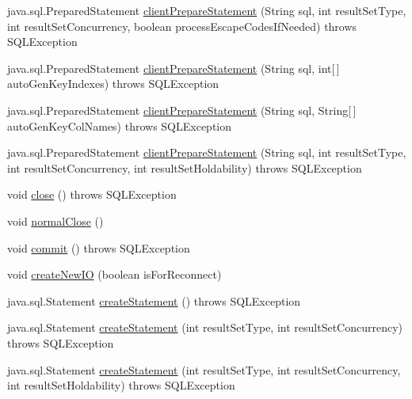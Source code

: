 \begin{DoxyCompactItemize}
java.\+sql.\+Prepared\+Statement \mbox{\hyperlink{classcom_1_1mysql_1_1cj_1_1jdbc_1_1_connection_impl_a18396b29f2d238be089029b1db546a00}{client\+Prepare\+Statement}} (String sql, int result\+Set\+Type, int result\+Set\+Concurrency, boolean process\+Escape\+Codes\+If\+Needed)  throws S\+Q\+L\+Exception 
\item 
java.\+sql.\+Prepared\+Statement \mbox{\hyperlink{classcom_1_1mysql_1_1cj_1_1jdbc_1_1_connection_impl_aec5834ec5d7244d13cefd58333b3c553}{client\+Prepare\+Statement}} (String sql, int\mbox{[}$\,$\mbox{]} auto\+Gen\+Key\+Indexes)  throws S\+Q\+L\+Exception 
\item 
java.\+sql.\+Prepared\+Statement \mbox{\hyperlink{classcom_1_1mysql_1_1cj_1_1jdbc_1_1_connection_impl_ade3184b1d304b0ab3a5a0f5d2f8f0539}{client\+Prepare\+Statement}} (String sql, String\mbox{[}$\,$\mbox{]} auto\+Gen\+Key\+Col\+Names)  throws S\+Q\+L\+Exception 
\item 
java.\+sql.\+Prepared\+Statement \mbox{\hyperlink{classcom_1_1mysql_1_1cj_1_1jdbc_1_1_connection_impl_ade6127c1a3fdabd2af201e60498afad4}{client\+Prepare\+Statement}} (String sql, int result\+Set\+Type, int result\+Set\+Concurrency, int result\+Set\+Holdability)  throws S\+Q\+L\+Exception 
\item 
void \mbox{\hyperlink{classcom_1_1mysql_1_1cj_1_1jdbc_1_1_connection_impl_a9d82246a207b618a8ce3dfcf349c971d}{close}} ()  throws S\+Q\+L\+Exception 
\item 
void \mbox{\hyperlink{classcom_1_1mysql_1_1cj_1_1jdbc_1_1_connection_impl_a4bfd91b48bd990b05482d972c940a53f}{normal\+Close}} ()
\item 
void \mbox{\hyperlink{classcom_1_1mysql_1_1cj_1_1jdbc_1_1_connection_impl_ac6218bc1a284e67ff9557bdefc52c388}{commit}} ()  throws S\+Q\+L\+Exception 
\item 
void \mbox{\hyperlink{classcom_1_1mysql_1_1cj_1_1jdbc_1_1_connection_impl_a063addf80134be647765cd125d270968}{create\+New\+IO}} (boolean is\+For\+Reconnect)
\item 
java.\+sql.\+Statement \mbox{\hyperlink{classcom_1_1mysql_1_1cj_1_1jdbc_1_1_connection_impl_ac07000b85a6e8197ac8ca945bc44bbec}{create\+Statement}} ()  throws S\+Q\+L\+Exception 
\item 
java.\+sql.\+Statement \mbox{\hyperlink{classcom_1_1mysql_1_1cj_1_1jdbc_1_1_connection_impl_a0d60b523a6d4c9b50523770c41b9ed3a}{create\+Statement}} (int result\+Set\+Type, int result\+Set\+Concurrency)  throws S\+Q\+L\+Exception 
\item 
java.\+sql.\+Statement \mbox{\hyperlink{classcom_1_1mysql_1_1cj_1_1jdbc_1_1_connection_impl_a94c0e54e85d6847d5b567d3ea6f857de}{create\+Statement}} (int result\+Set\+Type, int result\+Set\+Concurrency, int result\+Set\+Holdability)  throws S\+Q\+L\+Exception 

\end{DoxyCompactItemize}
